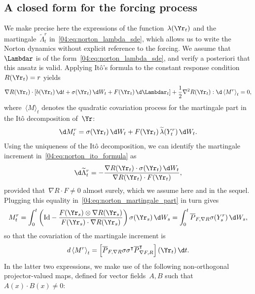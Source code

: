 \subsection{A closed form for the forcing process}\label{04:subsec:norton_lambda}
We make precise here the expressions of the function~$\lambda(\Yr_t)$ and the martingale~$\widetilde{\Lambda}^r_t$  in~\eqref{04:eq:norton_lambda_sde}, which allows us to write the Norton dynamics without explicit reference to the forcing. 
We assume that~$\Lambdar$ is of the form~\eqref{04:eq:norton_lambda_sde}, and verify a posteriori that this ansatz is valid.
Applying Itô's formula to the constant response condition~$R(\Yr_t)=r$ yields
\begin{equation}
\label{04:eq:norton_ito_formula}
    \nabla R(\Yr_t)\cdot \left[b(\Yr_t)\, \d t + \sigma(\Yr_t)\, \d W_t +  F(\Yr_t)\,\d\Lambdar_t\right] +\frac 12 \nabla ^2 R(\Yr_t) : \d\left\langle M^r\right\rangle_t = 0,
\end{equation}
where~$\langle M \rangle_t$ denotes the quadratic covariation process for the martingale part in the Itô decomposition of~$\Yr$:
\begin{equation}
    \label{04:eq:norton_martingale_part}
    \d M^r_t = \sigma(\Yr_t)\,\d W_t + F(\Yr_t)\,\widetilde{\lambda}(Y^r_t)\,\d W_t.
\end{equation}
Using the uniqueness of the Itô decomposition, we can identify the martingale increment in~\eqref{04:eq:norton_ito_formula} as
\begin{equation}
    \label{04:eq:norton_forcing_martingale_part}
    \d \widetilde{\Lambda}^r_t = -\frac{\nabla R(\Yr_t) \cdot \sigma(\Yr_t)\,\d W_t}{\nabla R(\Yr_t)\cdot F(\Yr_t)},
\end{equation}
provided that~$\nabla R \cdot F \neq 0$ almost surely, which we assume here and in the sequel.
Plugging this equality in~\eqref{04:eq:norton_martingale_part} in turn gives
\[
M_t^r = \int_0^t \left(\mathrm{Id} -\frac{F(\Yr_s) \otimes \nabla R(\Yr_s)}{F(\Yr_s) \cdot \nabla R(\Yr_s)}\right)\sigma(\Yr_s)\,\d W_s = \int_0^t\overline{P}_{F,\nabla R}\sigma(Y^r_s)\,\d W_s,
\]
so that the covariation of the martingale increment is
\begin{equation}
    \label{04:eq:norton_covariation_increment}
    d\left\langle M^r\right\rangle_t = \left[\overline{P}_{F,\nabla R} \sigma\sigma ^\intercal \overline{P}_{\nabla F,R}^\intercal\right](\Yr_t)\,\d t.
\end{equation}
In the latter two expressions, we make use of the following non-orthogonal projector-valued maps, defined for vector fields~$A,B$ such that~$A(x)\cdot B(x)\neq 0$:
